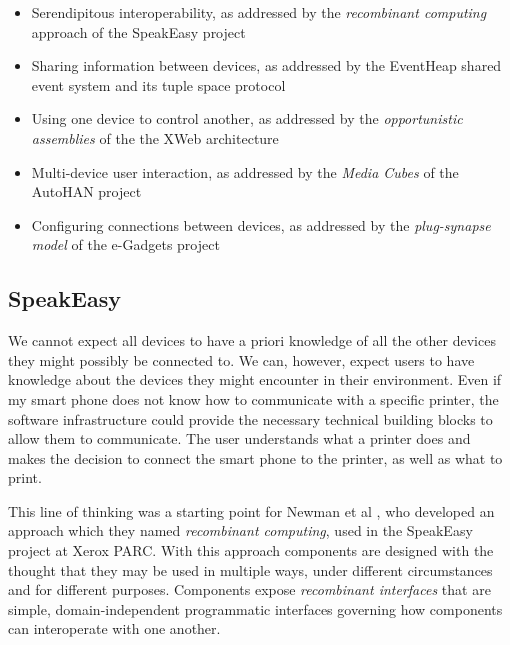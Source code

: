 \begin{itemize}
	\item Serendipitous interoperability, as addressed by the \emph{recombinant computing} approach of the SpeakEasy project
	\item Sharing information between devices, as addressed by the Event\-Heap shared event system and its tuple space protocol
	\item Using one device to control another, as addressed by the \emph{opportunistic assemblies} of the the XWeb architecture
	\item Multi-device user interaction, as addressed by the \emph{Media Cubes} of the AutoHAN project
	\item Configuring connections between devices, as addressed by the \emph{plug-synapse model} of the e-Gadgets project
\end{itemize}



\subsection{SpeakEasy}

We cannot expect all devices to have a priori knowledge of all the other devices they might possibly be connected to. We can, however, expect users to have knowledge about the devices they might encounter in their environment. Even if my smart phone does not know how to communicate with a specific printer, the software infrastructure could provide the necessary technical building blocks to allow them to communicate. The user understands what a printer does and makes the decision to connect the smart phone to the printer, as well as what to print.


This line of thinking was a starting point for Newman et al \cite{Newman2002}, who developed an approach which they named \emph{recombinant computing}, used in the SpeakEasy project at Xerox PARC. With this approach components are designed with the thought that they may be used in multiple ways, under different circumstances and for different purposes. Components expose \emph{recombinant interfaces} that are simple, domain-independent programmatic interfaces governing how components can interoperate with one another.

